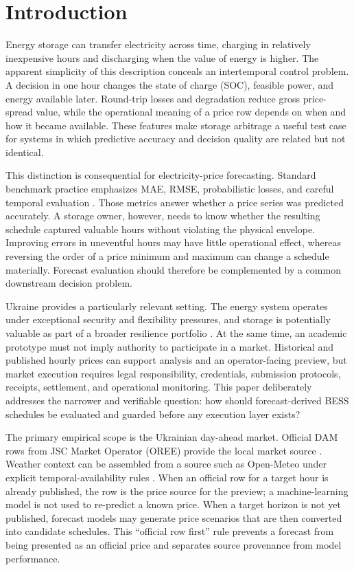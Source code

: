 \section{Introduction}

Energy storage can transfer electricity across time, charging in relatively inexpensive hours and discharging when the value of energy is higher. The apparent simplicity of this description conceals an intertemporal control problem. A decision in one hour changes the state of charge (SOC), feasible power, and energy available later. Round-trip losses and degradation reduce gross price-spread value, while the operational meaning of a price row depends on when and how it became available. These features make storage arbitrage a useful test case for systems in which predictive accuracy and decision quality are related but not identical.

This distinction is consequential for electricity-price forecasting. Standard benchmark practice emphasizes MAE, RMSE, probabilistic losses, and careful temporal evaluation \cite{lago2021epf}. Those metrics answer whether a price series was predicted accurately. A storage owner, however, needs to know whether the resulting schedule captured valuable hours without violating the physical envelope. Improving errors in uneventful hours may have little operational effect, whereas reversing the order of a price minimum and maximum can change a schedule materially. Forecast evaluation should therefore be complemented by a common downstream decision problem.

Ukraine provides a particularly relevant setting. The energy system operates under exceptional security and flexibility pressures, and storage is potentially valuable as part of a broader resilience portfolio \cite{iea2024ukraine}. At the same time, an academic prototype must not imply authority to participate in a market. Historical and published hourly prices can support analysis and an operator-facing preview, but market execution requires legal responsibility, credentials, submission protocols, receipts, settlement, and operational monitoring. This paper deliberately addresses the narrower and verifiable question: how should forecast-derived BESS schedules be evaluated and guarded before any execution layer exists?

The primary empirical scope is the Ukrainian day-ahead market. Official DAM rows from JSC Market Operator (OREE) provide the local market source \cite{oree2026dam}. Weather context can be assembled from a source such as Open-Meteo under explicit temporal-availability rules \cite{openmeteo2026archive}. When an official row for a target hour is already published, the row is the price source for the preview; a machine-learning model is not used to re-predict a known price. When a target horizon is not yet published, forecast models may generate price scenarios that are then converted into candidate schedules. This ``official row first'' rule prevents a forecast from being presented as an official price and separates source provenance from model performance.

